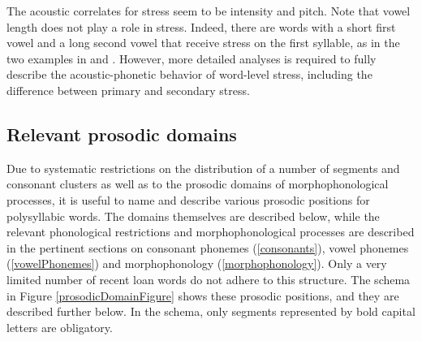 The acoustic correlates for stress seem to be intensity and pitch. 
Note that vowel length does not play a role in stress. Indeed, there are words with a short first vowel and a long second vowel that receive stress on the first syllable, as in the two examples in  and .
However, more detailed analyses is required to fully describe the acous\-tic\--pho\-ne\-tic behavior of word-level stress, including the difference between primary and secondary stress. 


\subsection{Relevant prosodic domains}\label{prosodicDomains}
Due to systematic restrictions on the distribution of a number of segments and consonant clusters as well as to the prosodic domains of morphophonological processes, it is useful to name and describe various prosodic positions for polysyllabic words. The domains themselves are described below, while the relevant phonological restrictions and morphophonological processes are described in the pertinent sections on consonant phonemes (\SEC\ref{consonants}), vowel phonemes (\SEC\ref{vowelPhonemes}) and morphophonology (\SEC\ref{morphophonology}). Only a very limited number of recent loan words do not adhere to this structure. 
The schema in Figure \vref{prosodicDomainFigure} shows these prosodic positions, and they are described further below. In the schema, only segments represented by bold capital letters are obligatory.
\newcommand{\Cyes}{\Bf{C}}
\newcommand{\Cno}{c}
\newcommand{\Vyes}{\Bf{V}}
\newcommand{\Vno}{v}
